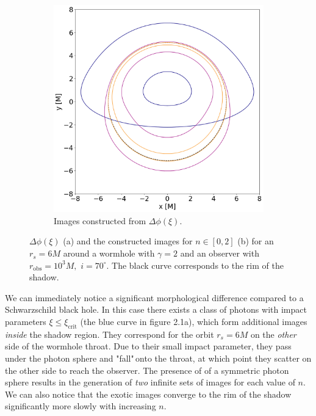 \documentclass[12pt]{article}
\numberwithin{equation}{section}
\numberwithin{figure}{section}
\begin{document}
\begin{figure}[h]
\begin{subfigure}{8cm}
			\includegraphics[scale = 0.27]{Section_6_Morphology_of_the images_of_horizonless_spacetimes/WH_70_deg_r6_gamma_2.png}
			\caption{Images constructed from $\Delta\phi(\xi)$.\newline} \label{fig:1b}
		\end{subfigure}
		\caption[$\Delta\phi(\xi)$ and the images for a $r_s=6M$ orbit around a wormhole for $n = 0,1,2$.]{\small $\Delta\phi(\xi)$ (a) and the constructed images for $n \in [0,2]$ (b) for an $r_s=6M$ around a wormhole with $\gamma = 2$ and an observer with $r_\text{obs} = 10^3M,\,\,i = 70^\circ$. The black curve corresponds to the rim of the shadow.} 
		\label{WH_r6_orbit}
	\end{figure}
	
	We can immediately notice a significant morphological difference compared to a Schwarzschild black hole. In this case there exists a class of photons with impact parameters $\xi \le \xi_\text{crit}$ (the blue curve in figure 2.1a), which form additional images \emph{inside} the shadow region. They correspond for the orbit $r_s = 6M$ on the \emph{other} side of the wormhole throat. Due to their small impact parameter, they pass under the photon sphere and "fall"$\,$onto the throat, at which point they scatter on the other side to reach the observer. The presence of of a symmetric photon sphere results in the generation of \emph{two} infinite sets of images for each value of $n$. We can also notice that the exotic images converge to the rim of the shadow significantly more slowly with increasing $n$.\\
	
\end{document}
